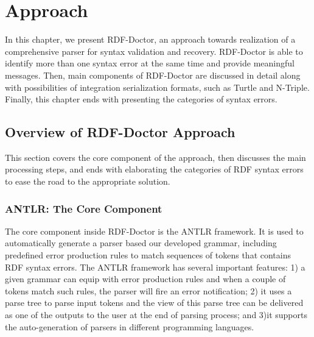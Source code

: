 \chapter{Approach}
\label{ch:approach}
In this chapter, we present RDF-Doctor, an approach towards realization of a comprehensive parser for syntax validation and recovery.
RDF-Doctor is able to identify more than one syntax error at the same time and provide meaningful messages.
Then, main components of RDF-Doctor are discussed in detail along with possibilities of integration serialization formats, such as Turtle and N-Triple. Finally, this chapter ends with presenting the categories of syntax errors.


\section{Overview of RDF-Doctor Approach}

This section covers the core component of the approach, then discusses the main processing steps, and ends with elaborating the categories of RDF syntax errors to ease the road to the appropriate solution. 

\subsection{ANTLR: The Core Component}

The core component inside RDF-Doctor is the ANTLR framework. It is used to automatically generate a parser based our developed grammar, including predefined error production rules to match sequences of tokens that contains RDF syntax errors.
The ANTLR framework has several important features: 1) a given grammar can equip with error production rules and when a couple of tokens match such rules, the parser will fire an error notification; 2) it uses a parse tree to parse input tokens and the view of this parse tree can be delivered as one of the outputs to the user at the end of parsing process; and 3)it supports the auto-generation of parsers in different programming languages.


